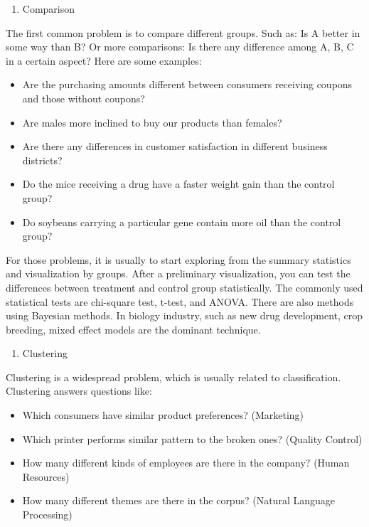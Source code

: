 \documentclass[12pt,]{krantz}
\providecommand{\tightlist}{%
  \setlength{\itemsep}{0pt}\setlength{\parskip}{0pt}}
\theoremstyle{definition}
\theoremstyle{definition}
\theoremstyle{definition}
\theoremstyle{remark}
\begin{document}
\begin{enumerate}
\def\labelenumi{\arabic{enumi}.}
\setcounter{enumi}{1}
\tightlist
\item
  Comparison
\end{enumerate}

The first common problem is to compare different groups. Such as: Is A
better in some way than B? Or more comparisons: Is there any difference
among A, B, C in a certain aspect? Here are some examples:

\begin{itemize}
\tightlist
\item
  Are the purchasing amounts different between consumers receiving
  coupons and those without coupons?
\item
  Are males more inclined to buy our products than females?
\item
  Are there any differences in customer satisfaction in different
  business districts?
\item
  Do the mice receiving a drug have a faster weight gain than the
  control group?
\item
  Do soybeans carrying a particular gene contain more oil than the
  control group?
\end{itemize}

For those problems, it is usually to start exploring from the summary
statistics and visualization by groups. After a preliminary
visualization, you can test the differences between treatment and
control group statistically. The commonly used statistical tests are
chi-square test, t-test, and ANOVA. There are also methods using
Bayesian methods. In biology industry, such as new drug development,
crop breeding, mixed effect models are the dominant technique.

\begin{enumerate}
\def\labelenumi{\arabic{enumi}.}
\setcounter{enumi}{2}
\tightlist
\item
  Clustering
\end{enumerate}

Clustering is a widespread problem, which is usually related to
classification. Clustering answers questions like:

\begin{itemize}
\tightlist
\item
  Which consumers have similar product preferences? (Marketing)
\item
  Which printer performs similar pattern to the broken ones? (Quality
  Control)
\item
  How many different kinds of employees are there in the company? (Human
  Resources)
\item
  How many different themes are there in the corpus? (Natural Language
  Processing)
\end{itemize}
\end{document}
